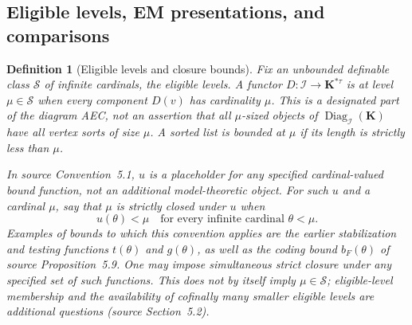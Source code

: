 \documentclass[11pt]{article}
\newcommand{\K}{\mathbf K}
\theoremstyle{plain}
\newtheorem{definition}{Definition}[section]
\begin{document}
\subsection{Eligible levels, EM presentations, and comparisons}
\begin{definition}[Eligible levels and closure bounds]
Fix an unbounded definable class $\mathcal S$
of infinite cardinals, the \emph{eligible levels}.
A functor $D:\mathcal I\to\K^{*\tau}$ is at level
$\mu\in\mathcal S$ when every component $D(v)$
has cardinality $\mu$. This is a designated
part of the diagram AEC, not an assertion
that all $\mu$-sized objects of
$\operatorname{Diag}_{\mathcal I}(\K)$ have
all vertex sorts of size $\mu$.
A sorted list is \emph{bounded at $\mu$}
if its length is strictly less than $\mu$.

In source Convention~5.1, $u$ is a
\emph{placeholder for any specified
cardinal-valued bound function},
not an additional model-theoretic object.
For such $u$ and a cardinal $\mu$, say
that $\mu$ is \emph{strictly closed under $u$}
when
\[
u(\theta)<\mu
\quad\text{for every infinite cardinal }\theta<\mu.
\]
Examples of bounds to which this convention
applies are the earlier stabilization and
testing functions $t(\theta)$ and $g(\theta)$,
as well as the coding bound $b_F(\theta)$
of source Proposition~5.9.
One may impose simultaneous strict closure
under any specified set of such functions.
This does not by itself imply $\mu\in\mathcal S$;
eligible-level membership and the availability
of cofinally many smaller eligible levels
are additional questions (source Section~5.2).
\end{definition}
\end{document}
